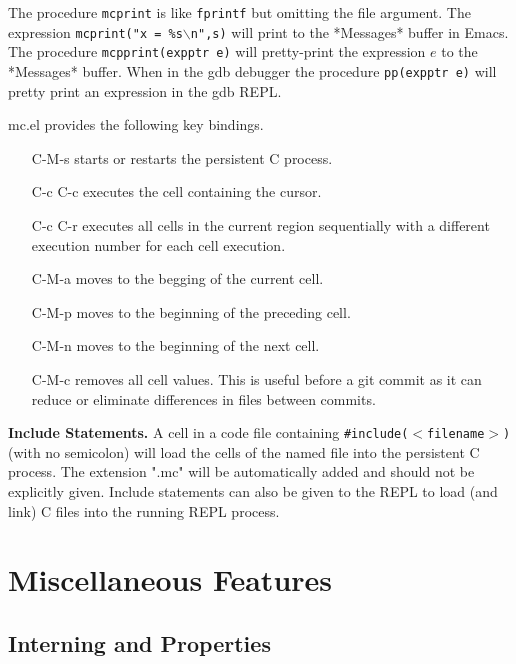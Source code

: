\documentclass{article}
\begin{document}
 The procedure {\tt mcprint} is like {\tt fprintf} but omitting the file argument. The expression
{\tt mcprint("x = \%s$\backslash$n",s)} will print to the *Messages* buffer in Emacs. The procedure {\tt mcpprint(expptr e)}
will pretty-print the expression $e$ to the *Messages* buffer.  When in the gdb debugger the procedure {\tt pp(expptr e)} will
pretty print an expression in the gdb REPL.

  mc.el provides the following key bindings.

\begin{itemize}
\item[C-M-s] starts or restarts the persistent C process.

\item[C-c C-c] executes the cell containing the cursor.
  
\item[C-c C-r] executes all cells in the current region sequentially with a different execution number for each cell execution.

\item[C-M-a] moves to the begging of the current cell.

\item[C-M-p] moves to the beginning of the preceding cell.

\item[C-M-n] moves to the beginning of the next cell.

\item[C-M-c] removes all cell values.  This is useful before a git commit as it can reduce or eliminate differences
in files between commits.
\end{itemize}

{\bf Include Statements.}  A cell in a code file containing {\tt \#include($<$filename$>$)} (with no semicolon) will load the cells of the named
file into the persistent C process.  The extension ".mc" will be automatically added and should not be explicitly given.
Include statements can also be given to the REPL to load (and link) C files into the running REPL process.

\section{Miscellaneous Features}

\subsection{Interning and Properties}
\end{document}
